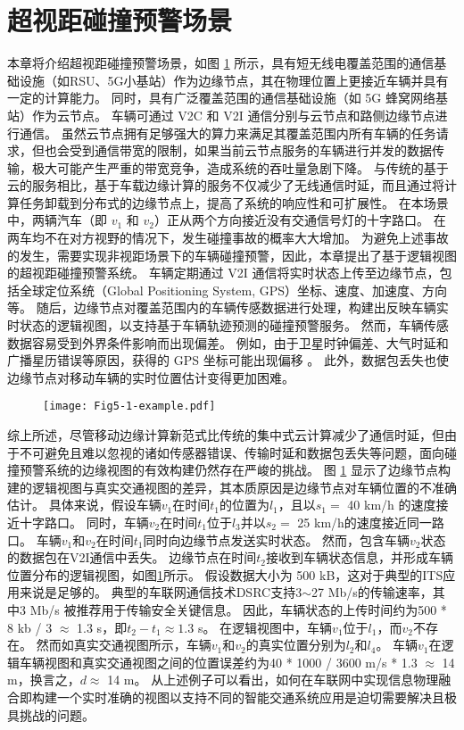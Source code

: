 \section{超视距碰撞预警场景}\label{section 5-2}

本章将介绍超视距碰撞预警场景，如图 \ref{fig 5-1} 所示，具有短无线电覆盖范围的通信基础设施（如RSU、5G小基站）作为边缘节点，其在物理位置上更接近车辆并具有一定的计算能力。
同时，具有广泛覆盖范围的通信基础设施（如 5G 蜂窝网络基站）作为云节点。
车辆可通过 V2C 和 V2I 通信分别与云节点和路侧边缘节点进行通信。
虽然云节点拥有足够强大的算力来满足其覆盖范围内所有车辆的任务请求，但也会受到通信带宽的限制，如果当前云节点服务的车辆进行并发的数据传输，极大可能产生严重的带宽竞争，造成系统的吞吐量急剧下降。
与传统的基于云的服务相比，基于车载边缘计算的服务不仅减少了无线通信时延，而且通过将计算任务卸载到分布式的边缘节点上，提高了系统的响应性和可扩展性。
在本场景中，两辆汽车（即 $v_1$ 和 $v_2$）正从两个方向接近没有交通信号灯的十字路口。
在两车均不在对方视野的情况下，发生碰撞事故的概率大大增加。
为避免上述事故的发生，需要实现非视距场景下的车辆碰撞预警，因此，本章提出了基于逻辑视图的超视距碰撞预警系统。
车辆定期通过 V2I 通信将实时状态上传至边缘节点，包括全球定位系统（Global Positioning System, GPS）坐标、速度、加速度、方向等。
随后，边缘节点对覆盖范围内的车辆传感数据进行处理，构建出反映车辆实时状态的逻辑视图，以支持基于车辆轨迹预测的碰撞预警服务。
然而，车辆传感数据容易受到外界条件影响而出现偏差。
例如，由于卫星时钟偏差、大气时延和广播星历错误等原因，获得的 GPS 坐标可能出现偏移 \cite{liu2013improving}。
此外，数据包丢失也使边缘节点对移动车辆的实时位置估计变得更加困难。

\begin{figure}[h]
	\centering
	\texttt{[image: Fig5-1-example.pdf]}
	\label{fig 5-1}
\end{figure}

综上所述，尽管移动边缘计算新范式比传统的集中式云计算减少了通信时延，但由于不可避免且难以忽视的诸如传感器错误、传输时延和数据包丢失等问题，面向碰撞预警系统的边缘视图的有效构建仍然存在严峻的挑战。
图 \ref{fig 5-1} 显示了边缘节点构建的逻辑视图与真实交通视图的差异，其本质原因是边缘节点对车辆位置的不准确估计。
具体来说，假设车辆$v_1$在时间$t_1$的位置为$l_1$，且以$s_1 =$ 40 km/h 的速度接近十字路口。
同时，车辆$v_2$在时间$t_1$位于$l_3$并以$s_2=$ 25 km/h的速度接近同一路口。
车辆$v_1$和$v_2$在时间$t_1$同时向边缘节点发送实时状态。
然而，包含车辆$v_2$状态的数据包在V2I通信中丢失。
边缘节点在时间$t_2$接收到车辆状态信息，并形成车辆位置分布的逻辑视图，如图\ref{fig 5-1}所示。
假设数据大小为 500 kB，这对于典型的ITS应用来说是足够的\cite{liu2013improving}。
典型的车联网通信技术DSRC支持3$\sim$27 Mb/s的传输速率，其中3 Mb/s 被推荐用于传输安全关键信息\cite{kenney2011dedicated}。
因此，车辆状态的上传时间约为500 * 8 kb / 3 $\approx$ 1.3 s，即${t_2} - {t_1} \approx 1.3$ s。
在逻辑视图中，车辆$v_1$位于$l_1$，而$v_2$不存在。
然而如真实交通视图所示，车辆$v_1$和$v_2$的真实位置分别为$l_2$和$l_4$。
车辆$v_1$在逻辑车辆视图和真实交通视图之间的位置误差约为40 * 1000 / 3600 m/s * 1.3 $\approx$ 14 m，换言之，$d \approx$ 14 m。
从上述例子可以看出，如何在车联网中实现信息物理融合即构建一个实时准确的视图以支持不同的智能交通系统应用是迫切需要解决且极具挑战的问题。

